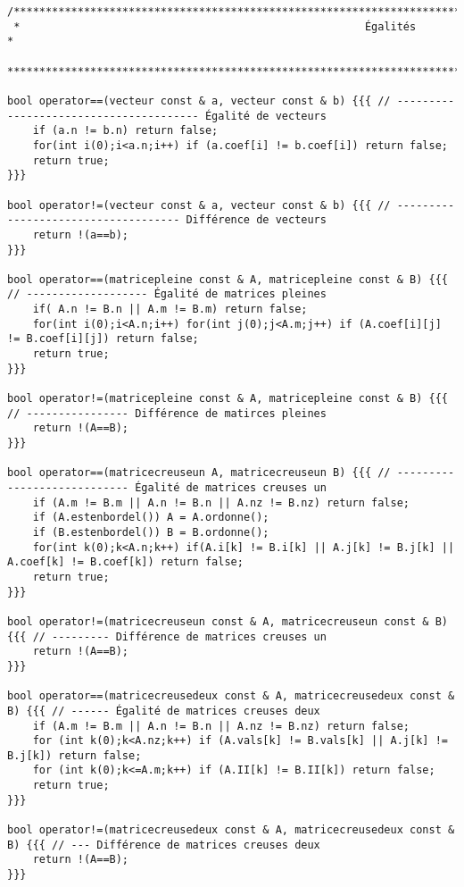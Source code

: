 \documentclass[a4paper]{article}
\begin{document}
\begin{verbatim}
/**********************************************************************************************************************
 *                                                      Égalités                                                      *
 **********************************************************************************************************************/

bool operator==(vecteur const & a, vecteur const & b) {{{ // --------------------------------------- Égalité de vecteurs
    if (a.n != b.n) return false;
    for(int i(0);i<a.n;i++) if (a.coef[i] != b.coef[i]) return false;
    return true;
}}}

bool operator!=(vecteur const & a, vecteur const & b) {{{ // ------------------------------------ Différence de vecteurs
    return !(a==b);
}}}

bool operator==(matricepleine const & A, matricepleine const & B) {{{ // ------------------- Égalité de matrices pleines
    if( A.n != B.n || A.m != B.m) return false;
    for(int i(0);i<A.n;i++) for(int j(0);j<A.m;j++) if (A.coef[i][j] != B.coef[i][j]) return false;
    return true;
}}}

bool operator!=(matricepleine const & A, matricepleine const & B) {{{ // ---------------- Différence de matirces pleines
    return !(A==B);
}}}

bool operator==(matricecreuseun A, matricecreuseun B) {{{ // ---------------------------- Égalité de matrices creuses un
    if (A.m != B.m || A.n != B.n || A.nz != B.nz) return false;
    if (A.estenbordel()) A = A.ordonne();
    if (B.estenbordel()) B = B.ordonne();
    for(int k(0);k<A.n;k++) if(A.i[k] != B.i[k] || A.j[k] != B.j[k] || A.coef[k] != B.coef[k]) return false;
    return true;
}}}

bool operator!=(matricecreuseun const & A, matricecreuseun const & B) {{{ // --------- Différence de matrices creuses un
    return !(A==B);
}}}

bool operator==(matricecreusedeux const & A, matricecreusedeux const & B) {{{ // ------ Égalité de matrices creuses deux
    if (A.m != B.m || A.n != B.n || A.nz != B.nz) return false;
    for (int k(0);k<A.nz;k++) if (A.vals[k] != B.vals[k] || A.j[k] != B.j[k]) return false;
    for (int k(0);k<=A.m;k++) if (A.II[k] != B.II[k]) return false;
    return true;
}}}

bool operator!=(matricecreusedeux const & A, matricecreusedeux const & B) {{{ // --- Différence de matrices creuses deux
    return !(A==B);
}}}


\end{verbatim}
\end{document}
